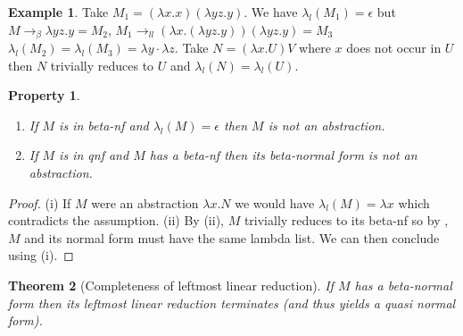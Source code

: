 \documentclass[xchauthor,chkrefs,GCNS,amsmath,amsthm,rotating,leaveRGB]{tcsg}
\theoremstyle{plain}
\newtheorem{theorem}{Theorem}[section]
\newtheorem{property}[theorem]{Property}
\theoremstyle{definition}
\newtheorem{example}{Example}[section]
\newcommand{\llred}{\rightarrow_{ll}}
\begin{document}
\begin{example}
Take $M_{1} = (\lambda x . x) (\lambda y z . y)$. We have $\lambda
_{l}(M_{1}) = \epsilon $ but $M \rightarrow _\beta \lambda y z . y = M_{2}$,
$M_{1} \llred (\lambda x . (\lambda y z . y)) (\lambda y z . y) = M_{3}$  $\lambda _{l}(M_{2}) = \lambda _{l}(M_{3}) = \lambda y \cdot \lambda z$.
Take $N = (\lambda x . U) V$ where $x$ does not occur in $U$ then $N$
trivially reduces to $U$ and $\lambda _{l}(N) = \lambda _{l}(U)$.
\end{example}

\begin{property}\label{prop:qnf_betanf_empty_lambdalist}
%
\begin{enumerate}[\textit{(ii)}]
\item[\textit{(i)}] If $M$ is in beta-nf and $\lambda _{l}(M) = \epsilon $ then $M$
    is not an abstraction.
\item[\textit{(ii)}] If $M$ is in \emph{qnf} and $M$ has a beta-nf then its
    beta-normal form is not an abstraction.
\end{enumerate}
\end{property}

\begin{proof}
(i) If $M$ were an abstraction $\lambda x. N$ we would have $\lambda _{l}(M)
= \lambda x$ which contradicts the assumption. (ii) By
(ii), $M$ trivially reduces to its
beta-nf so by , $M$ and
its normal form must have the same lambda list. We can then conclude using
(i).
\end{proof}

\begin{theorem}[Completeness of leftmost linear reduction]\label{thm:completeness_leftmostlinearred}
If $M$ has a beta-normal form then its leftmost linear reduction terminates
(and thus yields a quasi normal form).
\end{theorem}
\end{document}
